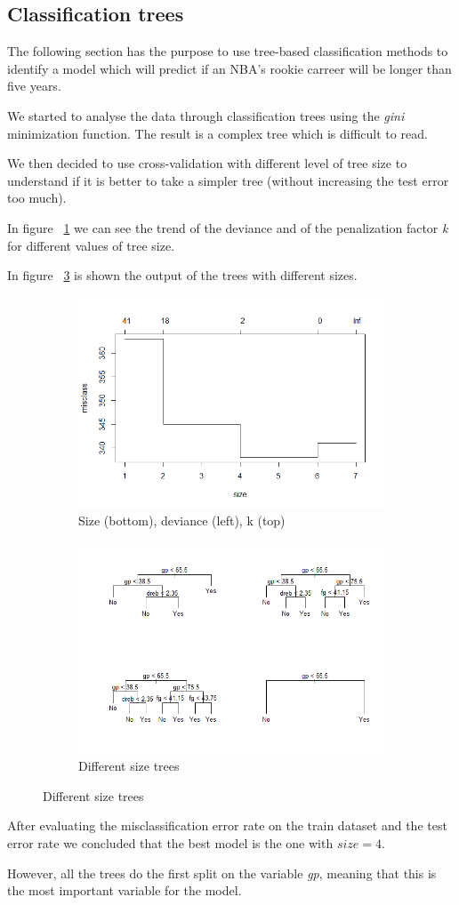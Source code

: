 \subsection{Classification trees}

The following section has the purpose to use tree-based classification methods to identify a model which will predict if an NBA's rookie carreer will be longer than five years.

We started to analyse the data through classification trees using the \textit{gini} minimization function. The result is a complex tree which is difficult to read.

We then decided to use cross-validation with different level of tree size to understand if it is better to take a simpler tree (without increasing the test error too much).

In figure \Fig~\ref{fig:tree_cv_plot} we can see the trend of the deviance and of the penalization factor \textit{k} for different values of tree size.

In figure \Fig~\ref{fig:tree_prune_comparison} is shown the output of the trees with different sizes.

\begin{figure}[h]
	\centering
	\begin{subfigure}{.6\textwidth}
		\centering
		\includegraphics[width=0.5\linewidth]{ImageFiles/Classification/tree_cv_plot}
		\caption{Size (bottom), deviance (left), k (top)}
		\label{fig:tree_cv_plot}
	\end{subfigure}%
	\begin{subfigure}{.6\textwidth}
		\centering
		\includegraphics[width=0.5\linewidth]{ImageFiles/Classification/tree_prune_comparison}
		\caption{Different size trees}
		\label{fig:tree_prune_comparison}
	\end{subfigure}
\end{figure}

After evaluating the misclassification error rate on the train dataset and the test error rate we concluded that the best model is the one with $size = 4$.

However, all the trees do the first split on the variable \textit{gp}, meaning that this is the most important variable for the model.
